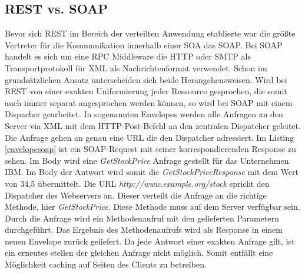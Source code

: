 \documentclass[fleqn,10pt,ngerman]{SelfArx}
\begin{document}
\subsection{REST vs. SOAP}
Bevor sich REST im Bereich der verteilten Anwendung etablierte war die größte Vertreter für die Kommunikation innerhalb einer SOA das SOAP. Bei SOAP handelt es sich um eine RPC Middleware die HTTP oder SMTP als Transportprotokoll für XML als Nachrichtenformat verwendet. Schon im grundsätzlichen Ansatz unterscheiden sich beide Herangehensweisen. Wird bei REST von einer exakten Uniformierung jeder Ressource gesprochen, die somit auch immer separat angesprochen werden können, so wird bei SOAP mit einem Dispacher gearbeitet. In sogenannten Envelopes werden alle Anfragen an den Server via XML mit dem HTTP-Post-Befehl an den zentralen Dispatcher geleitet. Die Anfrage gehen an genau eine URL die den Dispatcher adressiert. Im Listing \ref{envelopesoap} ist ein SOAP-Request mit seiner korrespondierenden Response zu sehen. Im Body wird eine \textit{GetStockPrice} Anfrage gestellt für das Unternehmen IBM. Im Body der Antwort wird somit die \textit{GetStockPriceResponse} mit dem Wert von 34,5 übermittelt. Die URL \textit{http://www.example.org/stock} spricht den Dispatcher des Webservers an. Dieser verteilt die Anfrage an die richtige Methode, hier \textit{GetStockPrice}. Diese Methode muss auf dem Server verfügbar sein. Durch die Anfrage wird ein Methodenaufruf mit den gelieferten Parametern durchgeführt. Das Ergebnis des Methodenaufrufs wird als Response in einem neuen Envelope zurück geliefert. Da jede Antwort einer exakten Anfrage gilt, ist ein erneutes stellen der gleichen Anfrage nicht möglich. Somit entfällt eine Möglichkeit caching auf Seiten des Clients zu betreiben.
\end{document}
